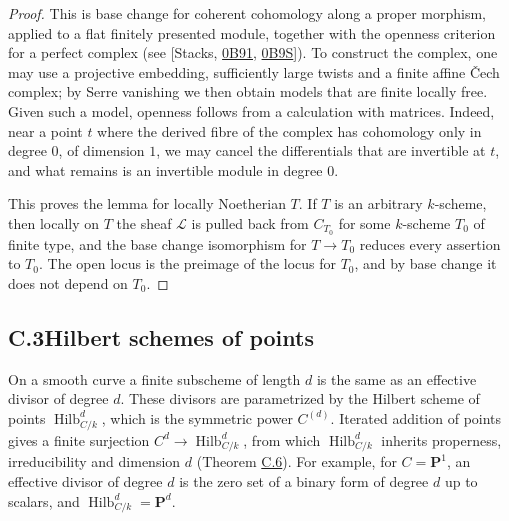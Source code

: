\documentclass[11pt]{article}
\begin{document}
\begin{proof}[{Proof}]\label{bp18}%
This is base change for coherent cohomology along a proper morphism, applied to a flat finitely presented module, together with the openness criterion for a perfect complex (see [Stacks, \href{https://stacks.math.columbia.edu/tag/0B91}{0B91}, \href{https://stacks.math.columbia.edu/tag/0B9S}{0B9S}]). To construct the complex, one may use a projective embedding, sufficiently large twists and a finite affine Čech complex; by Serre vanishing we then obtain models that are finite locally free. Given such a model, openness follows from a calculation with matrices. Indeed, near a point \(t\) where the derived fibre of the complex has cohomology only in degree \(0\), of dimension \(1\), we may cancel the differentials that are invertible at \(t\), and what remains is an invertible module in degree \(0\).

This proves the lemma for locally Noetherian \(T\). If \(T\) is an arbitrary \(k\)-scheme, then locally on \(T\) the sheaf \(\mathcal L\) is pulled back from \(C_{T_0}\) for some \(k\)-scheme \(T_0\) of finite type, and the base change isomorphism for \(T\to T_0\) reduces every assertion to \(T_0\). The open locus is the preimage of the locus for \(T_0\), and by base change it does not depend on \(T_0\).
\end{proof}


\subsection*{\texorpdfstring{C.3\quad Hilbert schemes of points}{C.3 Hilbert schemes of points}}
\label{bp19}%
\label{bp20}%
On a smooth curve a finite subscheme of length \(d\) is the same as an effective divisor of degree \(d\). These divisors are parametrized by the Hilbert scheme of points \(\operatorname{Hilb}^{d}_{C/k}\), which is the symmetric power \(C^{(d)}\). Iterated addition of points gives a finite surjection \(C^d\to \operatorname{Hilb}^{d}_{C/k}\), from which \(\operatorname{Hilb}^{d}_{C/k}\) inherits properness, irreducibility and dimension \(d\) (Theorem \hyperref[bp21]{C.6}). For example, for \(C=\mathbf P^1\), an effective divisor of degree \(d\) is the zero set of a binary form of degree \(d\) up to scalars, and \(\operatorname{Hilb}^{d}_{C/k}=\mathbf P^d\).
\end{document}
